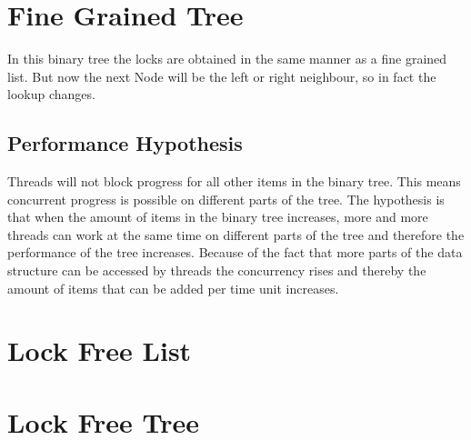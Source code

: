 \documentclass[10pt,a4paper]{article}
\begin{document}
\section{Fine Grained Tree}
In this binary tree the locks are obtained in the same manner as a fine grained
list. But now the next Node will be the left or right neighbour, so in fact the
lookup changes. 

\subsection{Performance Hypothesis}
Threads will not block progress for all other items in the binary tree. This
means concurrent progress is possible on different parts of the tree.
The hypothesis is that when the amount of items
in the binary tree increases, more and more threads can work at the same time
on different parts of the tree and therefore the performance of the tree increases.
Because of the fact that more parts of the data structure can be accessed by
threads the concurrency rises and thereby the amount of items that can be added
per time unit increases.


\section{Lock Free List}

\section{Lock Free Tree}
\end{document}
